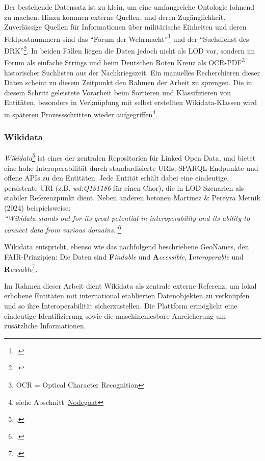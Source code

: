 \documentclass[12pt, a4paper, ngerman, bidi=default]{article}
\let\cite\footcite
\begin{document}
Der bestehende Datensatz ist zu klein, um eine umfangreiche Ontologie lohnend zu machen. Hinzu kommen externe Quellen, und deren Zugänglichkeit. Zuverlässige Quellen für Informationen 
über militärische Einheiten und deren Feldpostnummern sind das \enquote{Forum der Wehrmacht}\cite[ vgl.][]{altenburger_lexikon_nodate} 
und der \enquote{Suchdienst des DRK}\cite[ vgl.][]{reuter_drk_2025}. In beiden Fällen liegen die Daten jedoch nicht als LOD vor, sondern im Forum als einfache Strings 
und beim Deutschen Roten Kreuz als OCR-PDF\footnote{OCR = Optical Character Recognition} historischer Suchlisten aus der Nachkriegszeit. Ein manuelles Recherchieren dieser Daten scheint zu diesem Zeitpunkt
den Rahmen der Arbeit zu sprengen. Die in diesem Schritt geleistete Vorarbeit beim Sortieren und Klassifizieren von Entitäten, besonders in Verknüpfung mit selbst erstellten Wikidata-Klassen 
wird in späteren Prozessschritten wieder aufgegriffen\footnote{siehe Abschnitt~\hyperref[subsec:Nodegoat_chapter]{Nodegoat}}.

\subsubsection{Wikidata}

\textit{Wikidata}\cite[vgl.][]{noauthor_wikidata_nodate} ist eines der zentralen Repositorien für Linked Open Data, und bietet eine hohe Interoperabilität durch standardisierte
URIs, SPARQL-Endpunkte und offene APIs zu den Entitäten.
Jede Entität erhält dabei eine eindeutige, persistente URI 
(z.B. \colorbox{VeryLightGray}{\textit{wd:Q131186}} für einen Chor), die in LOD-Szenarien 
als stabiler Referenzpunkt dient.
Neben anderen betonen Martinez \& Pereyra Metnik (2024) beispielsweise: \\
\textit{\enquote{Wikidata stands out for its great potential in interoperability and its ability to connect data from various domains.}}\cite{martinez_comparative_nodate}

Wikidata entspricht, ebenso wie das nachfolgend beschriebene GeoNames, den FAIR-Prinzipien: Die Daten sind 
\textbf{F}\textit{indable} und \textbf{A}\textit{ccessible}, \textbf{I}\textit{nteroperable} und \textbf{R}\textit{eusable}\cite[ vgl.][S. 2]{wilkinson_fair_2016}.

Im Rahmen dieser Arbeit dient Wikidata als zentrale externe Referenz, um lokal erhobene Entitäten mit international etablierten Datenobjekten 
zu verknüpfen und so ihre Interoperabilität sicherzustellen. Die Plattform ermöglicht eine eindeutige Identifizierung sowie die maschinenlesbare 
Anreicherung um zusätzliche Informationen.
\end{document}

